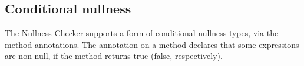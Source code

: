 %


\subsection{Conditional nullness\label{conditional-nullness}}

The Nullness Checker supports a form of conditional nullness types, via the
 method annotations.
The annotation on a method declares that some expressions are non-null, if
the method returns true (false, respectively).

